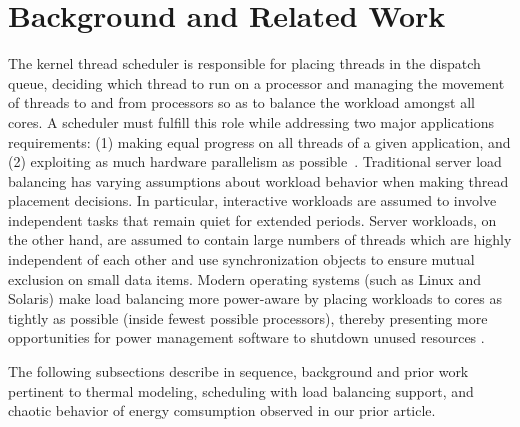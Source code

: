 \documentclass[times, 10pt,twocolumn]{IEEEtran}
\begin{document}
\section{Background and Related Work}
\label{sec:related}
The kernel thread scheduler is responsible for placing threads in the
dispatch queue, deciding which thread to run on a processor
and managing the movement of threads to and from processors
so as to balance the workload amongst all cores.
A scheduler must fulfill this role while addressing two major applications requirements:
(1) making equal progress on all threads of a given application, 
and (2) exploiting as much hardware parallelism as
possible~\cite{Hofmeyr2010}. Traditional server load balancing
has varying assumptions about workload behavior when making thread placement decisions.  
In particular, interactive workloads are assumed to involve independent tasks that remain quiet for extended periods.  
Server workloads, on the other hand, are assumed to contain large numbers of threads
which are highly independent of each other and use synchronization objects to
ensure mutual exclusion on small data items. 
Modern operating systems (such as Linux and Solaris)
make load balancing more power-aware by placing 
workloads to cores as tightly as possible (inside fewest possible processors),
thereby presenting more opportunities for power management software to shutdown
unused resources \cite{Sun2009,Sun2009b,Xia2010}.

The following subsections describe in sequence,
background and prior work pertinent to thermal modeling,
scheduling with load balancing support, and chaotic behavior of energy comsumption
observed in our prior article.
\end{document}
